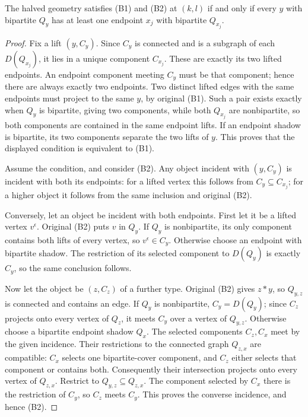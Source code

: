 \begin{theorem}\label{NG.leaf}
The halved geometry satisfies (B1) and (B2) at $(k,l)$ if and only if
every $y$ with bipartite $Q_y$ has at least one endpoint $x_j$ with
bipartite $Q_{x_j}$.
\end{theorem}
\begin{proof}
Fix a lift $(y,C_y)$. Since $C_y$ is connected and is a subgraph of
each $D(Q_{x_j})$, it lies in a unique component $C_{x_j}$. These are
exactly its two lifted endpoints. An endpoint component meeting $C_y$
must be that component; hence there are always exactly two endpoints.
Two distinct lifted edges with the same endpoints must project to the
same $y$, by original (B1). Such a pair exists exactly when $Q_y$ is
bipartite, giving two components, while both $Q_{x_j}$ are nonbipartite,
so both components are contained in the same endpoint lifts. If an
endpoint shadow is bipartite, its two components separate the two lifts
of $y$. This proves that the displayed condition is equivalent to (B1).

Assume the condition, and consider (B2). Any object incident with
$(y,C_y)$ is incident with both its endpoints: for a lifted vertex this
follows from $C_y\subseteq C_{x_j}$; for a higher object it follows
from the same inclusion and original (B2).

Conversely, let an object be incident with both endpoints. First let
it be a lifted vertex $v^\epsilon$. Original (B2) puts $v$ in $Q_y$.
If $Q_y$ is nonbipartite, its only component contains both lifts of
every vertex, so $v^\epsilon\in C_y$. Otherwise choose an endpoint
with bipartite shadow. The restriction of its selected component to
$D(Q_y)$ is exactly $C_y$, so the same conclusion follows.

Now let the object be $(z,C_z)$ of a further type. Original (B2)
gives $z*y$, so $Q_{y,z}$ is connected and contains an edge. If $Q_y$
is nonbipartite, $C_y=D(Q_y)$; since $C_z$ projects onto every vertex
of $Q_z$, it meets $C_y$ over a vertex of $Q_{y,z}$. Otherwise choose
a bipartite endpoint shadow $Q_x$. The selected components $C_z,C_x$
meet by the given incidence. Their restrictions to the connected
graph $Q_{z,x}$ are compatible: $C_x$ selects one bipartite-cover
component, and $C_z$ either selects that component or contains both.
Consequently their intersection projects onto every vertex of
$Q_{z,x}$. Restrict to $Q_{y,z}\subseteq Q_{z,x}$. The component
selected by $C_x$ there is the restriction of $C_y$, so $C_z$ meets
$C_y$. This proves the converse incidence, and hence (B2).
\end{proof}

